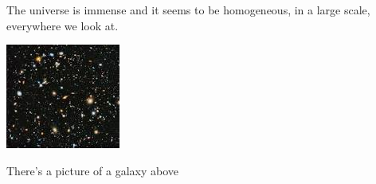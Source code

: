 \documentclass{article}
\begin{document}
The universe is immense and it seems to be homogeneous, 
in a large scale, everywhere we look at.

\includegraphics{universe}

There's a picture of a galaxy above
\end{document}
